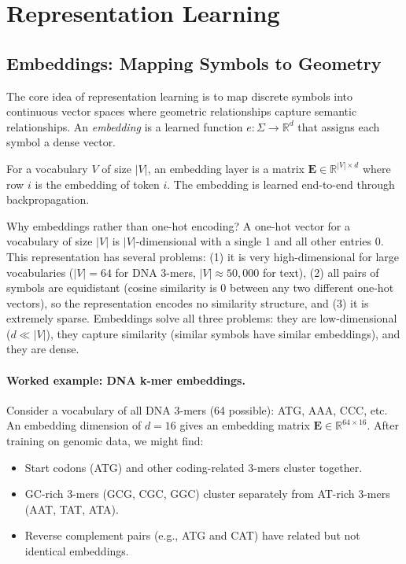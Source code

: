 \section{Representation Learning}
\label{sec:representation-learning}

\subsection{Embeddings: Mapping Symbols to Geometry}

The core idea of representation learning is to map discrete symbols into continuous vector spaces where geometric relationships capture semantic relationships. An \emph{embedding} is a learned function $e : \Sigma \to \mathbb{R}^d$ that assigns each symbol a dense vector.

For a vocabulary $V$ of size $|V|$, an embedding layer is a matrix $\mathbf{E} \in \mathbb{R}^{|V| \times d}$ where row $i$ is the embedding of token $i$. The embedding is learned end-to-end through backpropagation.

Why embeddings rather than one-hot encoding? A one-hot vector for a vocabulary of size $|V|$ is $|V|$-dimensional with a single 1 and all other entries 0. This representation has several problems: (1) it is very high-dimensional for large vocabularies ($|V| = 64$ for DNA 3-mers, $|V| \approx 50{,}000$ for text), (2) all pairs of symbols are equidistant (cosine similarity is 0 between any two different one-hot vectors), so the representation encodes no similarity structure, and (3) it is extremely sparse. Embeddings solve all three problems: they are low-dimensional ($d \ll |V|$), they capture similarity (similar symbols have similar embeddings), and they are dense.

\paragraph{Worked example: DNA k-mer embeddings.} Consider a vocabulary of all DNA 3-mers (64 possible): ATG, AAA, CCC, etc. An embedding dimension of $d = 16$ gives an embedding matrix $\mathbf{E} \in \mathbb{R}^{64 \times 16}$. After training on genomic data, we might find:
\begin{itemize}[leftmargin=1.5em]
  \item Start codons (ATG) and other coding-related 3-mers cluster together.
  \item GC-rich 3-mers (GCG, CGC, GGC) cluster separately from AT-rich 3-mers (AAT, TAT, ATA).
  \item Reverse complement pairs (e.g., ATG and CAT) have related but not identical embeddings.
\end{itemize}


